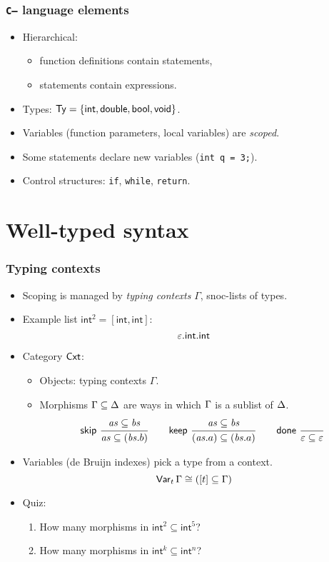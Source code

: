 \documentclass[t,fleqn,usenames,dvipsnames]{beamer}
\newcommand{\cAnn}{\color{red!80!black}}%
\renewcommand{\emph}[1]{{\cAnn#1}}
\newcommand{\cType}{\color{orange!60!black}}
\renewcommand{\emph}[1]{\textit{\cType#1}}
\newcommand{\Var}[2][]{\mathsf{Var}_{#1}\,#2}
\newcommand{\tskip}{\mathsf{skip}}
\newcommand{\tkeep}{\mathsf{keep}}
\newcommand{\tdone}{\mathsf{done}}
\newcommand{\sublist}{\subseteq}
\newcommand{\tint}{\mathsf{int}}
\newcommand{\tbool}{\mathsf{bool}}
\newcommand{\tvoid}{\mathsf{void}}
\newcommand{\tdouble}{\mathsf{double}}
\newcommand{\Cmm}{\texttt{C--}\xspace}
\begin{document}
\begin{frame}[fragile=singleslide]
  \frametitle{\Cmm language elements}
  \vspace{-3ex}
  \begin{itemize}
  \item Hierarchical:
    \begin{itemize}
    \item function definitions contain statements,
    \item statements contain expressions.
    \end{itemize}
  \item Types: $\Ty = \{ \tint, \tdouble,  \tbool, \tvoid \}$.
  \item Variables (function parameters, local variables) are \emph{scoped}.
  \item Some statements declare new variables (\verb|int q = 3;|).
  \item Control structures: \verb|if|, \verb|while|, \verb|return|.
  \end{itemize}
\end{frame}


\section{Well-typed syntax}

\begin{frame}%
  \frametitle{Typing contexts}
  \vspace{-3ex}
  \begin{itemize}
  \item Scoping is managed by \emph{typing contexts} $\Gamma$,
    snoc-lists of types.
  \item Example list $\tint^2 = [\tint,\tint]$:
$$
  \Ge.\tint.\tint
$$
\vspace{-2ex}
  \item Category $\mathsf{Cxt}$:
    \begin{itemize}
    \item Objects: typing contexts $\Gamma$.
    \item Morphisms $\GG \sublist \GD$ are ways in which $\Gamma$ is a
      sublist of $\Delta$.
\[
  \nru{\tskip}{\vas \sublist \vbs}{\vas \sublist (\vbs.b)}
\qquad
  \nru{\tkeep}{\vas \sublist \vbs}{(\vas.a) \sublist (\vbs.a)}
\qquad
  \nru{\tdone}{}{\Ge \sublist \Ge}
\]
    \end{itemize}
  \item Variables (de Bruijn indexes) pick a type from a context.
\[
  \Var[t] \GG \cong ([t] \sublist \GG)
\]
\vspace{-2ex}
  \item Quiz:
    \begin{enumerate}
    \item How many morphisms in $\tint^2 \sublist \tint^5$?
    \item How many morphisms in $\tint^k \sublist \tint^n$?
    \end{enumerate}
  \end{itemize}
\end{frame}
\end{document}
